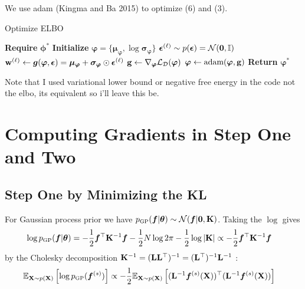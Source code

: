 \documentclass{article}
\begin{document}
We use adam (Kingma and Ba 2015) to optimize (6) and (3).

\begin{algorithm}
\caption{Optimize ELBO}
\begin{algorithmic}[1]
\State \textbf{Require} $\bm \phi^*$
\State \textbf{Initialize} $\bm \varphi =\{ \bm \mu _{\bm \varphi} , \log \bm \sigma _{\bm \varphi}  \}$
    \State $ \bm \epsilon ^{(\ell)} \sim p(\bm \epsilon) = \mathcal{N} ( \mathbf{0} , \mathbb{I}) $
    \State $ \mathbf{w}  ^{(\ell)} \gets \bm g(\bm \varphi, \bm \epsilon) = \bm \mu _{\bm \varphi} + \bm \sigma _{\bm \varphi}\odot \bm \epsilon ^{(\ell)}$
    \State  $\B g \gets \nabla _{\bm \varphi} \elbo _{\tiny \D} (\bm \varphi ) $
    \State $\bm \varphi \gets \text{adam}(\bm\varphi , \mathbf{g}  )$
\EndWhile
\State \textbf{Return} $\bm \varphi^*$
\end{algorithmic}
\end{algorithm}

Note that I used variational lower bound or negative free energy in the code not the elbo, its equivalent so i'll leave this be.

\newpage

\section{Computing Gradients in Step One and Two}

\subsection{Step One by Minimizing the KL}
For Gaussian process prior we have 
$ \pgp (\bm f | \bm \theta ) \sim \N (\bm f | \B 0 , \B K )$. 
Taking the $\log$ gives
\begin{align}
    \log \pgp (\bm f | \bm \theta ) &= - \half \bm f^\top \B K ^{-1}\bm f 
                                      - \half N \log 2\pi - \half \log | \B K  | 
                                    \propto - \half \bm f^\top \B K ^{-1}\bm f 
\end{align}
by the Cholesky decomposition  
$ \mathbf{K}   ^{-1}= ( \mathbf{L}   \mathbf{L} ^\top )^{-1} = ( \mathbf{L} ^\top )^{-1}  \mathbf{L} ^{-1}$ :  
\begin{align}
 \E_{\X \sim p(\B X)} \BB{\log \pgp (\bm f ^{(s)}) } &\propto 
 - \half  \E _{\X \sim p(\B X)} \BB{ (\B L ^{-1} \bm f^{(s)}(\X) )^\top( \B  L^{-1} \bm f^{(s)}(\X)) }  
\end{align}
\end{document}
